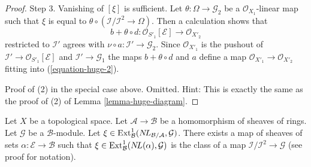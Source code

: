 \begin{proof}
\medskip\noindent
Step 3. Vanishing of $[\xi]$ is sufficient. Let
$\theta : \Omega \to \mathcal{G}_2$ be a $\mathcal{O}_{X_1}$-linear map
such that $\xi$ is equal to
$\theta \circ (\mathcal{I}/\mathcal{I}^2 \to \Omega)$.
Then a calculation shows that
$$
b + \theta \circ d : \mathcal{O}_{S'_1}[\mathcal{E}] \to \mathcal{O}_{X'_2}
$$
restricted to $\mathcal{I}'$ agrees with
$\nu \circ a : \mathcal{I}' \to \mathcal{G}_2$. Since $\mathcal{O}_{X'_1}$
is the pushout of $\mathcal{I}' \to \mathcal{O}_{S'_1}[\mathcal{E}]$
and $\mathcal{I}' \to \mathcal{G}_1$ the maps $b + \theta \circ d$
and $a$ define a map
$\mathcal{O}_{X'_1} \to \mathcal{O}_{X'_2}$ fitting into
(\ref{equation-huge-2}).

\medskip\noindent
Proof of (2) in the special case above. Omitted. Hint:
This is exactly the same as the proof of (2) of Lemma \ref{lemma-huge-diagram}.
\end{proof}

\begin{lemma}
\label{lemma-NL-represent-ext-class}
Let $X$ be a topological space. Let $\mathcal{A} \to \mathcal{B}$ be a
homomorphism of sheaves of rings. Let $\mathcal{G}$ be a $\mathcal{B}$-module.
Let
$\xi \in \mathop{\mathrm{Ext}}\nolimits^1_\mathcal{B}(\mathop{N\!L}\nolimits_{\mathcal{B}/\mathcal{A}}, \mathcal{G})$. 
There exists a map of sheaves of sets $\alpha : \mathcal{E} \to \mathcal{B}$
such that $\xi \in \mathop{\mathrm{Ext}}\nolimits^1_\mathcal{B}(\mathop{N\!L}\nolimits(\alpha), \mathcal{G})$
is the class of a map $\mathcal{I}/\mathcal{I}^2 \to \mathcal{G}$
(see proof for notation).
\end{lemma}


